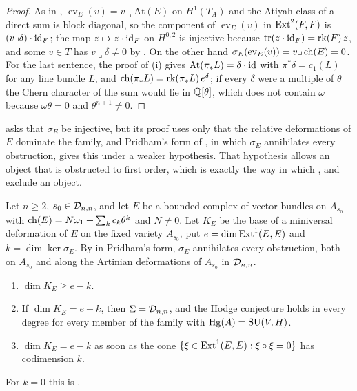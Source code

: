 \begin{proof}
As in \cite[Theorem~9.20]{paperI}, $\operatorname{ev}_{E}(v)=v\lrcorner\mathrm{At}(E)$
on $H^{1}(T_{A})$ and the Atiyah class of a direct sum is block diagonal, so
the component of $\operatorname{ev}_{E}(v)$ in $\operatorname{Ext}^{2}(F,F)$ is
$(v\lrcorner\delta)\cdot\operatorname{id}_{F}$; the map $z\mapsto z\cdot\operatorname{id}_{F}$ on
$H^{0,2}$ is injective because $\mathrm{tr}(z\cdot\operatorname{id}_{F})=\operatorname{rk}(F)\,z$, and
some $v\in T$ has $v\lrcorner\delta\ne0$ by \cite[Proposition~9.15(i)]{paperI}. On the
other hand $\sigma_{E}(\operatorname{ev}_{E}(v))=v\lrcorner\operatorname{ch}(E)=0$. For the
last sentence, the proof of (i) gives
$\mathrm{At}(\pi_{*}L)=\delta\cdot\operatorname{id}$ with $\pi^{*}\delta=c_{1}(L)$ for any
line bundle $L$, and $\operatorname{ch}(\pi_{*}L)=\operatorname{rk}(\pi_{*}L)\,e^{\delta}$; if every
$\delta$ were a multiple of $\theta$ the Chern character of the sum would lie
in $\mathbb{Q}[\theta]$, which does not contain $\omega$ because $\omega\theta=0$ and
$\theta^{n+1}\ne0$.
\end{proof}

 asks that $\sigma_{E}$ be injective, but its proof
uses only that the relative deformations of $E$ dominate the family, and
Pridham's form of , in which $\sigma_{E}$ annihilates every
obstruction, gives this under a weaker hypothesis. That hypothesis allows an
object that is obstructed to first order, which is exactly the way in which
\cite[Theorem~9.20]{paperI},  and  exclude
an object.

\begin{proposition}\label{prop:p2flat}
Let $n\ge2$, $s_{0}\in\mathcal{D}_{n,n}$, and let $E$ be a bounded complex of vector
bundles on $A_{s_{0}}$ with $\operatorname{ch}(E)=N\omega_{1}+\sum_{k}c_{k}\theta^{k}$ and
$N\ne0$. Let $K_{E}$ be the base of a miniversal deformation of $E$ on the
fixed variety $A_{s_{0}}$, put $e=\dim\operatorname{Ext}^{1}(E,E)$ and
$k=\dim\ker\sigma_{E}$. By  in Pridham's form, $\sigma_{E}$
annihilates every obstruction, both on $A_{s_{0}}$ and along the Artinian
deformations of $A_{s_{0}}$ in $\mathcal{D}_{n,n}$.
\begin{enumerate}[label=\textup{(\roman*)},leftmargin=2.6em,itemsep=2pt]
\item $\dim K_{E}\ge e-k$.
\item If $\dim K_{E}=e-k$, then $\Sigma=\mathcal{D}_{n,n}$, and the Hodge conjecture
  holds in every degree for every member of the family with
  $\operatorname{Hg}(A)=\operatorname{SU}(V,H)$.
\item $\dim K_{E}=e-k$ as soon as the cone
  $\{\xi\in\operatorname{Ext}^{1}(E,E):\xi\circ\xi=0\}$ has codimension $k$.
\end{enumerate}
For $k=0$ this is .
\end{proposition}

